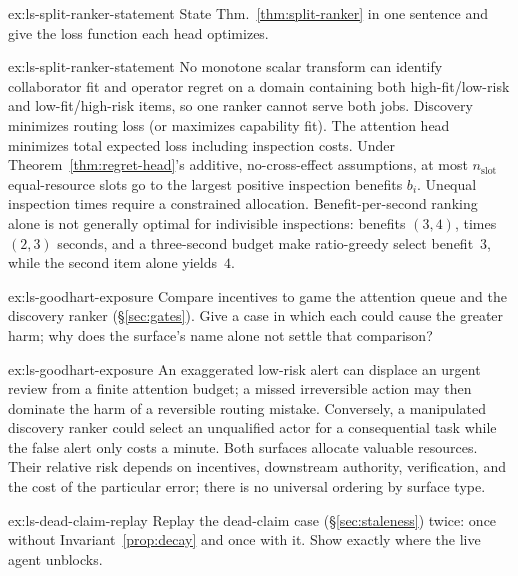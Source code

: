 \documentclass[11pt,a4paper]{article}
\theoremstyle{definition}
\theoremstyle{plain}
\begin{document}

\begin{pdexercise}[kind=Check,rating=1]{ex:ls-split-ranker-statement}
State Thm.~\ref{thm:split-ranker} in one sentence and give the loss function
each head optimizes.
\end{pdexercise}
\begin{pdsolution}{ex:ls-split-ranker-statement}
No monotone scalar transform can identify collaborator fit and operator regret
on a domain containing both high-fit/low-risk and low-fit/high-risk items, so
one ranker cannot serve both jobs. Discovery minimizes routing loss (or
maximizes capability fit). The attention head minimizes total expected loss
including inspection costs. Under Theorem~\ref{thm:regret-head}'s additive,
no-cross-effect assumptions, at most $n_{\mathrm{slot}}$ equal-resource slots go to the largest
positive inspection benefits $b_i$. Unequal inspection times require a
constrained allocation. Benefit-per-second ranking alone is not generally
optimal for indivisible inspections: benefits $(3,4)$, times $(2,3)$ seconds,
and a three-second budget make ratio-greedy select benefit~$3$, while the
second item alone yields~$4$.
\end{pdsolution}

\begin{pdexercise}[kind=Check,rating=1]{ex:ls-goodhart-exposure}
Compare incentives to game the attention queue and the discovery ranker
(\S\ref{sec:gates}). Give a case in which each could cause the greater harm;
why does the surface's name alone not settle that comparison?
\end{pdexercise}
\begin{pdsolution}{ex:ls-goodhart-exposure}
An exaggerated low-risk alert can displace an urgent review from a finite
attention budget; a missed irreversible action may then dominate the harm of a
reversible routing mistake. Conversely, a manipulated discovery ranker could
select an unqualified actor for a consequential task while the false alert only
costs a minute. Both surfaces allocate valuable resources. Their relative risk
depends on incentives, downstream authority, verification, and the cost of the
particular error; there is no universal ordering by surface type.
\end{pdsolution}
\begin{pdexercise}[kind=Trace,rating=2]{ex:ls-dead-claim-replay}
Replay the dead-claim case (\S\ref{sec:staleness}) twice: once without
Invariant~\ref{prop:decay} and once with it. Show exactly where the live agent unblocks.
\end{pdexercise}
\end{document}
